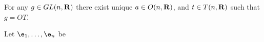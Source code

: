 


\def\R {{\bf R}}



For any $g\in GL(n,\bf R)$  there exist unique  $a\in O(n,\R)$,
and $t\in T(n,\R)$ such that $g=OT$.




  Let $\e_1,\dots,\e_n$ be








\bye
